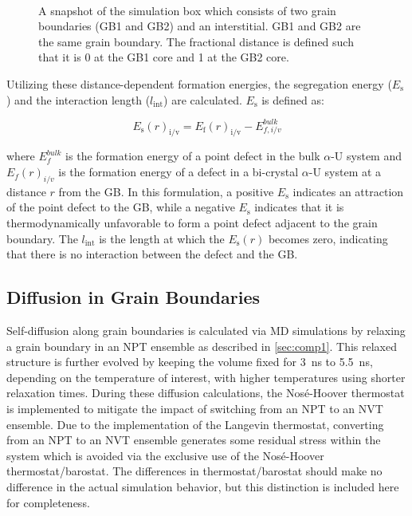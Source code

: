 \documentclass[review]{elsarticle}
\begin{document}
\begin{figure}[h!]
\centering
{}\\
\caption{A snapshot of the simulation box which consists of two grain boundaries (GB1 and GB2) and an interstitial. GB1 and GB2 are the same grain boundary. The fractional distance is defined such that it is 0 at the GB1 core and 1 at the GB2 core.}
\label{fig:GB}
\end{figure}

Utilizing these distance-dependent formation energies, the segregation energy ($E_{\mathrm{s}}$) and the interaction length ($l_{\mathrm{int}}$) are calculated. $E_{\mathrm{s}}$ is defined as:

\begin{equation}
\label{eq:eform2}
E_{\mathrm{s}}(r)_{\mathrm{i/v}} = E_{\mathrm{f}}(r)_{\mathrm{i/v}} - E_{f,i/v}^{bulk}
\end{equation}

\noindent where $E_{f}^{bulk}$ is the formation energy of a point defect in the bulk $\alpha$-U system and $E_f(r)_{i/v}$ is the formation energy of a defect in a bi-crystal $\alpha$-U system at a distance $r$ from the GB. In this formulation, a positive $E_{\mathrm{s}}$ indicates an attraction of the point defect to the GB, while a negative $E_{\mathrm{s}}$ indicates that it is thermodynamically unfavorable to form a point defect adjacent to the grain boundary. The  $l_{\mathrm{int}}$ is the length at which the $E_{\mathrm{s}}(r)$ becomes zero, indicating that there is no interaction between the defect and the GB.  

\subsection{Diffusion in Grain Boundaries}\label{sec:comp2}
\par Self-diffusion along grain boundaries is calculated via MD simulations 
by relaxing a grain boundary in an NPT ensemble as described in \cref{sec:comp1}. This relaxed structure is further evolved by keeping the volume fixed for 3~ns to 5.5~ns, depending on the temperature of interest, with higher temperatures using shorter relaxation times. During these diffusion calculations, the Nos\'{e}-Hoover thermostat is implemented to mitigate the impact of switching from an NPT to an NVT ensemble. Due to the implementation of the Langevin thermostat, converting from an NPT to an NVT ensemble generates some residual stress within the system which is avoided via the exclusive use of the Nos\'{e}-Hoover thermostat/barostat. The differences in thermostat/barostat should make no difference in the actual simulation behavior, but this distinction is included here for completeness. 
\end{document}

